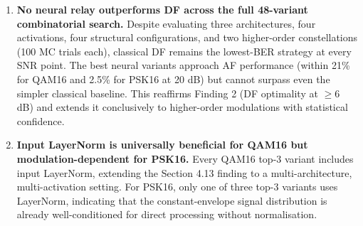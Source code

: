 \begin{enumerate}
  \textbf{Mamba S6 is the strongest architecture across the reported higher-order modulation experiments.} In the QAM16 top-3, Mamba S6 holds the \#1 position while the Transformer captures positions \#2 and \#3. In the PSK16 top-3, Mamba S6 sweeps all three positions. Within these experiments, the Mamba S6 architecture's selective state space mechanism appears well-suited to tracking both the multi-level amplitude structure of QAM and the rotational phase geometry of PSK.
\item
  \textbf{No neural relay outperforms DF across the full 48-variant combinatorial search.} Despite evaluating three architectures, four activations, four structural configurations, and two higher-order constellations (100 MC trials each), classical DF remains the lowest-BER strategy at every SNR point. The best neural variants approach AF performance (within 21\% for QAM16 and 2.5\% for PSK16 at 20 dB) but cannot surpass even the simpler classical baseline. This reaffirms Finding 2 (DF optimality at $\geq$6 dB) and extends it conclusively to higher-order modulations with statistical confidence.
\item
  \textbf{Input LayerNorm is universally beneficial for QAM16 but modulation-dependent for PSK16.} Every QAM16 top-3 variant includes input LayerNorm, extending the Section 4.13 finding to a multi-architecture, multi-activation setting. For PSK16, only one of three top-3 variants uses LayerNorm, indicating that the constant-envelope signal distribution is already well-conditioned for direct processing without normalisation.
\end{enumerate}

